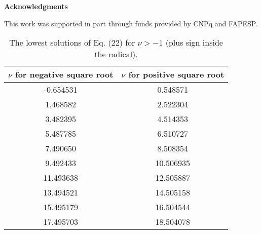 \documentclass[a4paper,12pt,titlepage]{article}
\begin{document}
\bigskip

\noindent \textbf{Acknowledgments}

This work was supported in part through funds provided by CNPq and FAPESP.

\smallskip 
\begin{table}[tbp]
\caption{The lowest solutions of Eq. (22) for $\nu >-1$ (plus sign inside
the radical).}
\label{t1}
\begin{center}
\begin{tabular}{|c|c|}
\hline\hline
$\nu$ \rm{for negative square root} & $\nu$ \rm {for positive square
root} \\ \hline
-0.654531 & 0.548571 \\ 
1.468582 & 2.522304 \\ 
3.482395 & 4.514353 \\ 
5.487785 & 6.510727 \\ 
7.490650 & 8.508354 \\ 
9.492433 & 10.506935 \\ 
11.493638 & 12.505887 \\ 
13.494521 & 14.505158 \\ 
15.495179 & 16.504544 \\ 
17.495703 & 18.504078 \\ \hline\hline
\end{tabular}
\end{center}
\end{table}
\end{document}
